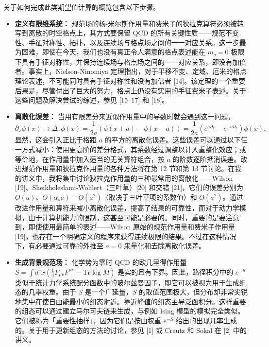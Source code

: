 关于如何完成此类期望值计算的概览包含以下步骤。
\begin{itemize}
  \item \textbf{定义有限维系统：} 规范场的杨-米尔斯作用量和费米子的狄拉克算符必须被转写到离散的时空格点上，其方式要保留 QCD 的所有关键性质——规范不变性、手征对称性、拓扑，以及连续场与格点场之间的一一对应关系。这一步最为困难，即使在今天，我们也没有真正令人满意的格点表述能在 $m_q = 0$ 极限下具有手征对称性，并保持连续场与格点场之间的一一对应关系，即没有加倍者。事实上，Nielson-Ninomiya 定理指出，对于平移不变、定域、厄米的格点理论表述，不可能同时具有手征对称性和没有加倍者 [14]。该定理的一个重要后果是，尽管付出了巨大的努力，格点上仍没有实用的手征费米子表述。关于这些问题及解决尝试的综述，参见 [15--17] 和 [18]。
  \item \textbf{离散化误差：} 当用有限差分来近似作用量中的导数时就会遇到这一问题，
    \begin{equation}
      \partial_x \phi(x) \to \Delta_x \phi(x)
      = \frac{1}{2a}\left( \phi(x + a) - \phi(x - a) \right)
      = \frac{1}{2a}\left( e^{a\partial_x} - e^{-a\partial_x} \right)\phi(x).
      \label{eq:derivative}
    \end{equation}
    显然，这会引入正比于格距 $a$ 的平方的离散化误差。这些误差可以通过以下任一方式减小：使用更高阶的差分格式，其系数经过调整以计入重整化效应；或等价地，在作用量中加入适当的无关算符组合，按 $a$ 的阶数逐阶抵消误差。改进规范作用量和狄拉克作用量的各种方法将在第 12 节和第 13 节讨论。在我的讲义中，我将集中讨论狄拉克作用量的三种最常用的离散化——Wilson [19]、Sheikholeslami-Wohlert（三叶草）[20] 和交错 [21]，它们的误差分别为 $O(a)$、$O(\alpha_s a) - O(a^2)$（取决于三叶草项的系数值）和 $O(a^2)$。通过改进作用量和算符来减小离散化误差，提高了结果的可靠性，而对于动力学模拟，由于计算机能力的限制，这甚至可能是必要的。同时，重要的是要注意到，即使使用最简单的表述——Wilson 原始的规范作用量和费米子作用量 [19]，也存在一个明确定义的程序来获得连续极限的结果。不过在这种情况下，有必要通过可靠的外推至 $a = 0$ 来量化和去除离散化误差。
  \item \textbf{生成背景规范场：} 化学势为零时 QCD 的欧几里得作用量 $S = \int d^4x ( \frac{1}{4} F_{\mu\nu}F^{\mu\nu} - \mathrm{Tr}\log M )$ 是实的且有下界。因此，路径积分中的 $e^{-S}$ 类似于统计力学系统配分函数中的玻尔兹曼因子，即它可以被视为用于生成组态的几率权重。由于 $S$ 是一个广延量，$S$ 的取值范围极大，但分布却非常尖锐地集中在使自由能最小的组态附近。靠近峰值的组态主导泛函积分。这样重要的组态可以通过建立马尔可夫链来生成，与例如 Ising 模型的模拟完全类似。它们被称为「重要性抽样」，因为它们是按由权重 $e^{-S}$ 给出的出现几率生成的。关于用于更新组态的方法的讨论，参见 [1] 或 Creutz 和 Sokal 在 [2] 中的讲义。

\end{itemize}
